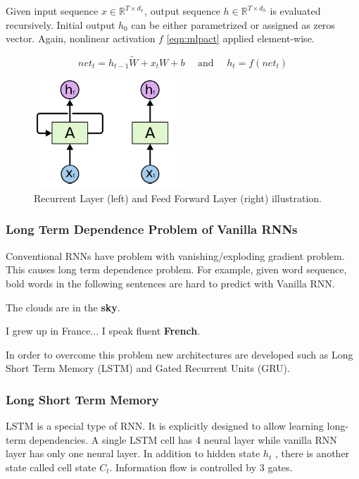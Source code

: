 Given input sequence $x \in \mathbb{R}^{T \times d_x}$, output sequence $h \in \mathbb{R}^{T \times d_h}$ is evaluated recursively. Initial output $h_0$ can be either parametrized or assigned as zeros vector. Again, nonlinear activation $f$ \ref{eqn:mlpact} applied element-wise. 

\begin{equation}
\label{eqn:rnnact}
net_t = h_{t-1} \tilde{W} + x_t W + b \quad \text{ and }\quad  h_t = f(net_t)
\end{equation}


\begin{figure}
	\centering
	\includegraphics[width=0.5\textwidth]{figures/ml_theory/rnn_vs_ffnn_layer.png}
	\caption{Recurrent Layer (left) and Feed Forward Layer (right) illustration.}
	\label{fig:rnn_vs_ffnn}
\end{figure}

\subsubsection{Long Term Dependence Problem of Vanilla RNNs}
Conventional RNNs have problem with vanishing/exploding gradient problem. This causes long term dependence problem. For example, given word sequence, bold words in the following sentences are hard to predict with Vanilla RNN.

\centerline{The clouds are in the \textbf{sky}.}
\centerline{I grew up in France... I speak fluent \textbf{French}.}

In order to overcome this problem new architectures are developed such as Long Short Term Memory (LSTM) and Gated Recurrent Units (GRU).

\subsubsection{Long Short Term Memory}
LSTM is a special type of RNN. It is explicitly designed to allow learning long-term dependencies. A single LSTM cell has 4 neural layer while vanilla RNN layer has only one neural layer. In addition to hidden state $h_t$ , there is another state called cell state $C_t$. Information flow is controlled by 3 gates. 

